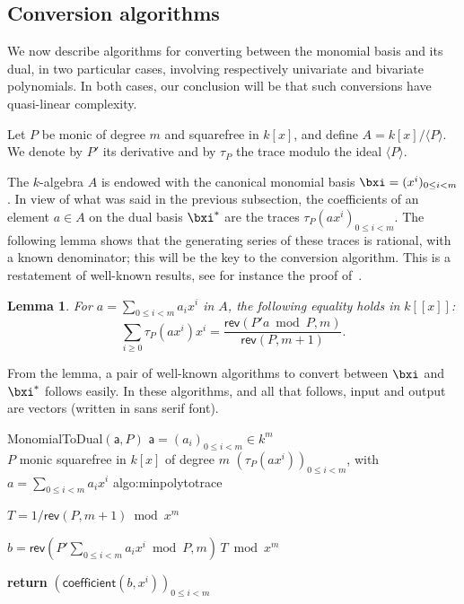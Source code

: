 \documentclass{sig-alternate}
\def\va {\ensuremath{\mathsf{a}}}
\def\coeff {\ensuremath{\mathsf{coefficient}}}
\def\rev {\ensuremath{\mathsf{rev}}}
\newcounter{algo}
\newenvironment{algorithm_noendline}[4]{\small\begin{center}\begin{minipage}{0.48\textwidth}
      \refstepcounter{algo}
      \label{#4}
      \sf
      \rule{\textwidth}{0.2pt}\\
      \makebox[\textwidth][c]{Algorithm~\arabic{algo}:~\textbf{#1}}\\
      \rule[0.5\baselineskip]{\textwidth}{0.2pt}\\

      \vspace{-12pt}

      \parbox{\textwidth}{\textbf{Input} #2}
      \parbox{\textwidth}{\textbf{Output} #3}

\vspace{-7pt}

      \begin{enumerate*}}{\end{enumerate*}
      \vspace{-11pt}
\end{minipage}\end{center}
}
\newcommand{\ang}[1]{\langle#1\rangle}
\newtheorem{Lemma}{Lemma}
\begin{document}

\subsection{Conversion algorithms} \label{ssec:conversions}
\label{sec:trace-formulas}

We now describe algorithms for converting between the monomial basis and its
dual, in two particular cases, involving respectively univariate
and bivariate polynomials. In both cases, our conclusion will be that
such conversions have quasi-linear complexity.

\smallskip{} 
Let $P$ be monic of degree $m$ and squarefree in $k[x]$, and define
$A=k[x]/\ang{P}$. We denote by $P'$ its derivative and by $\tau_P$ the trace modulo the ideal $\ang{P}$.

The $k$-algebra $A$ is endowed with the canonical monomial basis
$\bxi=(x^i)_{0 \le i < m}$. In view of what was said in the previous
subsection, the coefficients of an element $a \in A$ on the dual basis
$\bxi^\ast$ are the traces $\tau_P(ax^i)_{0 \le i < m}$. The following
lemma shows that the generating series of these traces is rational,
with a known denominator; this will be the key to the conversion
algorithm. This is a restatement of well-known results, see for
instance the proof of~\cite[Theorem~3.1]{rouiller99}.

\begin{Lemma}\label{lemma:trace:1}
  For $a=\sum_{0 \le i < m} a_i x^i$ in $A$, the following equality
  holds in $k[[x]]$:
  $$\sum_{i \ge 0} \tau_P(a x^i) x^i = \frac{\rev( P' a \bmod P,m)}{\rev(P,m+1)}.$$
\end{Lemma}

From the lemma, a pair of well-known algorithms to convert between
$\bxi$ and $\bxi^\ast$ follows easily. In these algorithms, and all
that follows, input and output are vectors (written in {\sf sans
  serif} font).

\begin{algorithm_noendline}
{MonomialToDual$(\va,P)$}
{$\va=(a_i)_{0 \le i < m} \in k^m$ \\  $P$ monic squarefree in $k[x]$ of degree $m$}
{$(\tau_P(a x^i))_{0 \le i < m}$, with $a=\sum_{0 \le i < m} a_i x^i$}
{algo:minpolytotrace}
\item $T = 1/\rev(P, m+1) \bmod x^m$
\item $b = \rev(P' \sum_{0 \le i < m} a_i x^i \bmod P, m)\, T \bmod x^m$
\item {\bf return} $(\coeff(b,x^i))_{0 \le i < m}$
\end{algorithm_noendline}
\end{document}

